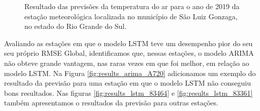 \begin{figure}[H]%
\caption{Resultado das previsões da temperatura do ar para o ano de 2019 da estação meteorológica localizada no município de São Luiz Gonzaga, no estado do Rio Grande do Sul.}
\centering
{}
\qquad
{}
\label{fig:results_arima_A826}%
\end{figure}

Avaliando as estações em que o modelo LSTM teve um desempenho pior do seu seu próprio RMSE Global, identificamos que, nessas estações, o modelo ARIMA não obteve grande vantagem, nas raras vezes em que foi melhor, em relação ao modelo LSTM. Na Figura \ref{fig:results_arima_A720} adicionamos um exemplo do resultado da previsão para uma estação em que o modelo LSTM não conseguiu bons resultados. Nas figuras \ref{fig:results_lstm_83464} e \ref{fig:results_lstm_83361} também apresentamos o resultados da previsão para outras estações. 

